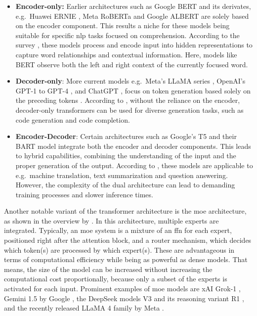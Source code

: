 \begin{itemize}
   \item \textbf{Encoder-only:} Earlier architectures such as Google BERT \cite{devlin_bert_2019} and its derivates, e.g.\ Huawei ERNIE \cite{zhang_ernie_2019}, Meta RoBERTa \cite{liu_roberta_2019} and Google ALBERT \cite{lan_albert_2020} are solely based on the encoder component. This results a niche for these models being suitable for specific \ac{nlp} tasks focused on comprehension. According to the survey \cite{hou_large_2024}, these models process and encode input into hidden representations to capture word relationships and contextual information. Here, models like BERT observe both the left and right context of the currently focused word.
   
   \item \textbf{Decoder-only}:
   More current models e.g.\ Meta's LLaMA series \cite{touvron_llama_2023}, OpenAI's GPT-1 \cite{radford_improving_2018} to GPT-4 \cite{openai_gpt-4_2024}, and ChatGPT \cite{openai_introducing_2022}, focus on token generation based solely on the preceding tokens \cite{shao_survey_2024}. According to \cite{hou_large_2024}, without the reliance on the encoder, decoder-only transformers can be used for diverse generation tasks, such as code generation and code completion.

   \item \textbf{Encoder-Decoder}: Certain architectures such as Google's T5 \cite{raffel_exploring_2023} and their BART model \cite{lewis_bart_2019} integrate both the encoder and decoder components. This leads to hybrid capabilities, combining the understanding of the input and the proper generation of the output. According to \cite{wang_history_2024}, these models are applicable to e.g.\ machine translation, text summarization and question answering. However, the complexity of the dual architecture can lead to demanding training processes and slower inference times.
\end{itemize}

 Another notable variant of the transformer architecture is the \ac{moe} \cite{shazeer_outrageously_2017} architecture, as shown in the overview by \cite{naveed_comprehensive_2024}. In this architecture, multiple experts are integrated. Typically, an \ac{moe} system is a mixture of an \ac{ffn} for each expert, positioned right after the attention block, and a router mechanism, which decides which token(s) are processed by which expert(s). These are advantageous in terms of computational efficiency while being as powerful as dense models. That means, the size of the model can be increased without increasing the computational cost proportionally, because only a subset of the experts is activated for each input. %
 Prominent examples of \ac{moe} models are xAI Grok-1 \cite{xai_open_2024}, Gemini 1.5 by Google \cite{team_gemini_2024-1}, the DeepSeek models V3 \cite{deepseek-ai_deepseek-v3_2025} and its reasoning variant R1 \cite{deepseek-ai_deepseek-r1_2025}, and the recently released LLaMA 4 family by Meta \cite{meta_ai_llama_2025}.

